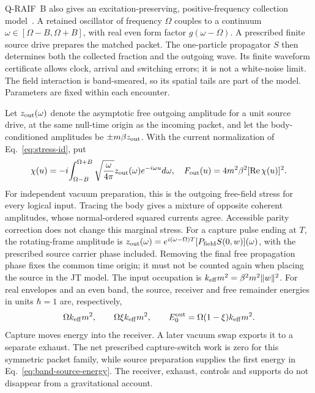 Q-RAIF~B also gives an excitation-preserving, positive-frequency collection
model~\cite{Liu2026QRAIFB}. A retained oscillator of frequency $\Omega$
couples to a continuum $\omega\in[\Omega-B,\Omega+B]$, with real even
form factor $g(\omega-\Omega)$. A prescribed finite source drive prepares
the matched packet. The one-particle propagator $S$ then determines both
the collected fraction and the outgoing wave. Its finite waveform certificate
allows clock, arrival and switching errors; it is not a white-noise limit.
The field interaction is band-smeared, so its spatial tails are part of the
model. Parameters are fixed within each encounter.

Let $z_{\rm out}(\omega)$ denote the asymptotic free outgoing amplitude for a
unit source drive, at the same null-time origin as the incoming packet,
and let the body-conditioned
amplitudes be $\pm m\beta z_{\rm out}$. With the current normalization of
Eq.~\eqref{eq:stress-id}, put
\begin{equation}
 \chi(u)=-i\!\int_{\Omega-B}^{\Omega+B}
 \sqrt{\frac{\omega}{4\pi}}z_{\rm out}(\omega)e^{-i\omega u}d\omega,
 \quad F_{\rm out}(u)=4m^2\beta^2[\operatorname{Re}\chi(u)]^2.
 \label{eq:band-out-stress}
\end{equation}
For independent vacuum preparation, this is the outgoing free-field stress
for every logical input. Tracing the body gives a mixture of opposite
coherent amplitudes, whose normal-ordered squared currents agree.
Accessible parity correction does not change this marginal stress.
For a capture pulse ending at $T$, the rotating-frame amplitude is
$z_{\rm out}(\omega)=e^{i(\omega-\Omega)T}
 [P_{\rm field}S(0,w)](\omega)$, with the prescribed source carrier phase
included. Removing the final free propagation phase fixes the common time
origin; it must not be counted again when placing the source in the JT model.
The input occupation is $k_{\rm eff}m^2=\beta^2m^2\|w\|^2$.
For real envelopes and an even band, the source, receiver and free remainder
energies in units $\hbar=1$ are, respectively,
\begin{equation}
 \Omega k_{\rm eff}m^2,\qquad
 \Omega\xi k_{\rm eff}m^2,\qquad
 E_0^{\rm out}=\Omega(1-\xi)k_{\rm eff}m^2.
 \label{eq:band-source-energy}
\end{equation}
Capture moves energy into the receiver. A later vacuum swap exports it to
a separate exhaust. The net prescribed capture-switch work is zero for
this symmetric packet family, while source preparation supplies the first
energy in Eq.~\eqref{eq:band-source-energy}. The receiver, exhaust, controls
and supports do not disappear from a gravitational account.

